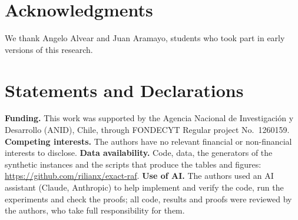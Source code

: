 \documentclass[11pt]{article}
\theoremstyle{definition}
\begin{document}
\section*{Acknowledgments}
We thank Angelo Alvear and Juan Aramayo, students who took part in early versions of this research.

\section*{Statements and Declarations}
\textbf{Funding.} This work was supported by the Agencia Nacional de Investigaci\'on y Desarrollo (ANID), Chile, through FONDECYT Regular project No.~1260159.
\textbf{Competing interests.} The authors have no relevant financial or non-financial interests to disclose.
\textbf{Data availability.} Code, data, the generators of the synthetic instances and the scripts that produce the tables and figures: \url{https://github.com/rilianx/exact-raf}.
\textbf{Use of AI.} The authors used an AI assistant (Claude, Anthropic) to help implement and verify the code, run the experiments and check the proofs; all code, results and proofs were reviewed by the authors, who take full responsibility for them.



\end{document}
